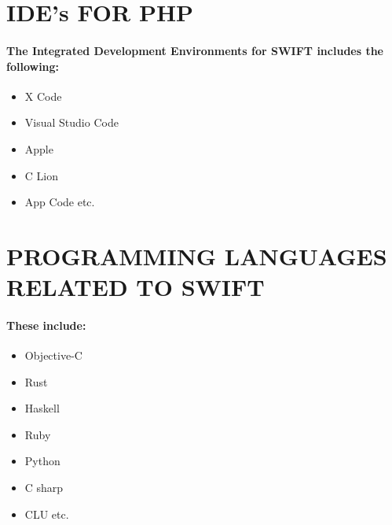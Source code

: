\documentclass{article}
\begin{document}
\section*{IDE’s FOR PHP}
\paragraph{The Integrated Development Environments for SWIFT includes the following:}
\begin{itemize}
	\item X Code
	\item Visual Studio Code
	\item Apple
	\item C Lion
	\item App Code etc.
	
\end{itemize}
\newpage
\section*{PROGRAMMING LANGUAGES RELATED TO SWIFT}
\paragraph{These include:
}
\begin{itemize}
	\item Objective-C 
	\item Rust 
	\item Haskell
	\item Ruby
	\item Python 
	\item C sharp
	\item CLU etc.
\end{itemize}
\end{document}
